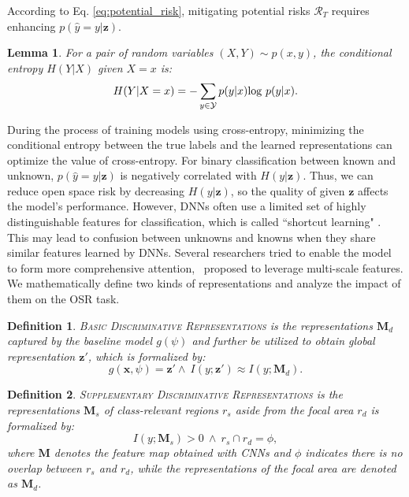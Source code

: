 \documentclass[letterpaper]{article} %
\newtheorem{lemma}{Lemma}
\newtheorem{definition}{Definition}
\begin{document}
According to Eq. \eqref{eq:potential_risk}, mitigating potential risks $\mathcal{R}_T$ requires enhancing $p(\hat{y}=y|\boldsymbol{z})$.
\begin{lemma} \cite{cover2012elements} 
For a pair of random variables $(X,Y)\sim p(x,y)$, the conditional entropy $H(Y|X)$ given $X=x$ is:
\begin{equation}
H(Y|X=x)=-\sum_{y\in\mathcal{Y}}p(y|x){\rm log}\ p(y|x).
\label{eq:cond_entro}
\end{equation}
\end{lemma}
During the process of training models using cross-entropy, minimizing the conditional entropy between the true labels and the learned representations can optimize the value of cross-entropy. For binary classification between known and unknown, $p(\hat{y}=y|\boldsymbol{z})$ is negatively correlated with $H(y|\boldsymbol{z})$. Thus, we can reduce open space risk by decreasing $H(y|\boldsymbol{z})$, so the quality of given $\boldsymbol{z}$ affects the model's performance. However, DNNs often use a limited set of highly distinguishable features for classification, which is called ``shortcut learning" \cite{geirhos2020shortcut}. This may lead to confusion between unknowns and knowns when they share similar features learned by DNNs. Several researchers tried to enable the model to form more comprehensive attention,~\cite{wang2018deep} proposed to leverage multi-scale features. We mathematically define two kinds of representations and analyze the impact of them on the OSR task. 

\begin{definition}
\textsc{Basic Discriminative Representations} is the representations $\boldsymbol{M}_d$ captured by the baseline model $g(\psi)$ and further be utilized to obtain global representation $\boldsymbol{z}'$, which is formalized by:
\begin{equation}
g(\boldsymbol{x},\psi)=\boldsymbol{z}' \wedge\ I(y;\boldsymbol{z}')\approx I(y;\boldsymbol{M}_d).
\label{eq:defin_fd}
\end{equation}
\end{definition}

\begin{definition}
\textsc{Supplementary Discriminative Representations} is the representations $\boldsymbol{M}_s$ of class-relevant regions $r_s$ aside from the focal area $r_d$ is formalized by:
\begin{equation}
I(y;\boldsymbol{M}_s)>0\ \wedge\ r_s\cap r_d=\phi,
\label{eq:defin_fs}
\end{equation}
where $\boldsymbol{M}$ denotes the feature map obtained with CNNs and $\phi$ indicates there is no overlap between $r_s$ and $r_d$, while the representations of the focal area are denoted as $\boldsymbol{M}_d$. 
\end{definition}
\end{document}
